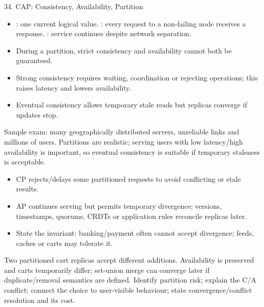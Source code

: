 \begin{topic}{34. CAP: Consistency, Availability, Partition}
\begin{itemize}
  \item {}: one current logical value. : every request to a non-failing node receives a response. : service continues despite network separation.
  \item During a partition, strict consistency and availability cannot both be guaranteed.
  \item Strong consistency requires waiting, coordination or rejecting operations; this raises latency and lowers availability.
  \item Eventual consistency allows temporary stale reads but replicas converge if updates stop.
\end{itemize}
\worked Sample exam: many geographically distributed servers, unreliable links and millions of users. Partitions are realistic; serving users with low latency/high availability is important, so eventual consistency is suitable if temporary staleness is acceptable.
\begin{itemize}
  \item CP rejects/delays some partitioned requests to avoid conflicting or stale results.
  \item AP continues serving but permits temporary divergence; versions, timestamps, quorums, CRDTs or application rules reconcile replicas later.
  \item State the invariant: banking/payment often cannot accept divergence; feeds, caches or carts may tolerate it.
\end{itemize}
\worked Two partitioned cart replicas accept different additions. Availability is preserved and carts temporarily differ; set-union merge can converge later if duplicate/removal semantics are defined.
\answer Identify partition risk; explain the C/A conflict; connect the choice to user-visible behaviour; state convergence/conflict resolution and its cost.
\end{topic}

